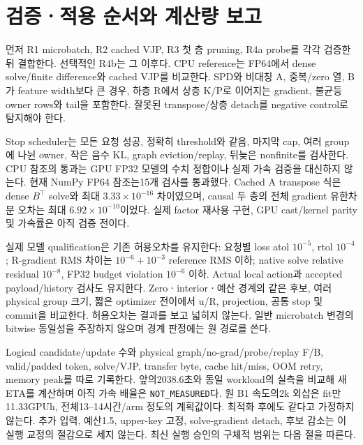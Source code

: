 \documentclass[11pt]{article}
\begin{document}
\section{검증ㆍ적용 순서와 계산량 보고}
먼저 R1 microbatch, R2 cached VJP, R3 첫 층 pruning, R4a probe를 각각 검증한 뒤 결합한다.
선택적인 R4b는 그 이후다. CPU reference는 FP64에서 dense solve/finite difference와
cached VJP를 비교한다. SPD와 비대칭 A, 중복/zero 열, B가 feature width보다 큰 경우,
하층 R에서 상층 K/P로 이어지는 gradient, 불균등 owner rows와 tail을 포함한다.
잘못된 transpose/상층 detach를 negative control로 탐지해야 한다.

Stop scheduler는 모든 요청 성공, 정확히 threshold와 같음, 마지막 cap, 여러 group에
나뉜 owner, 작은 음수 KL, graph eviction/replay, 뒤늦은 nonfinite를 검사한다.
CPU 참조의 통과는 GPU FP32 모델의 수치 정합이나 실제 가속 검증을 대신하지 않는다.
현재 NumPy FP64 참조는15개 검사를 통과했다. Cached A transpose 식은 dense
$B^\top$ solve와 최대 $3.33\times10^{-16}$ 차이였으며, causal 두 층의 전체
gradient 유한차분 오차는 최대 $6.92\times10^{-10}$이었다.
실제 factor 재사용 구현, GPU cast/kernel parity 및 가속률은 아직 검증 전이다.

실제 모델 qualification은 기존 허용오차를 유지한다: 요청별 loss atol $10^{-5}$,
rtol $10^{-4}$; R-gradient RMS 차이는 $10^{-6}+10^{-3}$ reference RMS 이하;
native solve relative residual $10^{-8}$, FP32 budget violation $10^{-6}$ 이하.
Actual local action과 accepted payload/history 검사도 유지한다.
Zeroㆍinteriorㆍ예산 경계의 같은 후보, 여러 physical group 크기, 짧은 optimizer 전이에서
u/R, projection, 공통 stop 및 commit을 비교한다. 허용오차는 결과를 보고 넓히지 않는다.
일반 microbatch 변경의 bitwise 동일성을 주장하지 않으며 경계 판정에는 원 경로를 쓴다.

Logical candidate/update 수와 physical graph/no-grad/probe/replay F/B, valid/padded token,
solve/VJP, transfer byte, cache hit/miss, OOM retry, memory peak를 따로 기록한다.
앞의2038.6초와 동일 workload의 실측을 비교해 새 ETA를 계산하며 아직 가속 배율은
\texttt{NOT\_MEASURED}다. 원 B1 속도의2k 외삽은 fit만11.33GPUh,
전체13--14시간/arm 정도의 계획값이다. 최적화 후에도 같다고 가정하지 않는다.
추가 입력, 예산1.5, upper-key 고정, solve-gradient detach, 후보 감소는 이 실행
교정의 절감으로 세지 않는다. 최신 실행 승인의 구체적 범위는 다음 절을 따른다.
\end{document}
